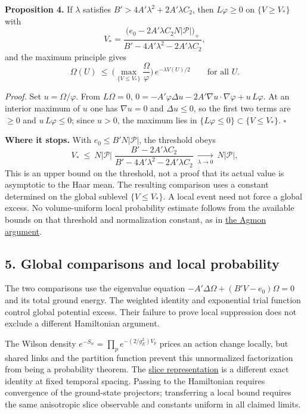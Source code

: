 \documentclass[11pt,a4paper]{article}
\begin{document}
\textbf{Proposition 4.} If \(\lambda\) satisfies
\(B'>4A'\lambda^2+2A'\lambda C_2\), then \(L\varphi\ge0\) on
\(\{V\ge V_*\}\) with
\[V_*=\frac{\big(e_0-2A'\lambda C_2N|\mathcal P|\big)_+}{B'-4A'\lambda^2-2A'\lambda C_2},\]
and the maximum principle gives
\[\Omega(U)\ \le\ \Big(\max_{\{V\le V_*\}}\frac{\Omega}{\varphi}\Big)\,e^{-\lambda V(U)/2}
\qquad\text{for all }U .\]

\emph{Proof.} Set \(u=\Omega/\varphi\). From \(L\Omega=0\),
\(0=-A'\varphi\Delta u-2A'\nabla u\!\cdot\!\nabla\varphi+u\,L\varphi\).
At an interior maximum of \(u\) one has \(\nabla u=0\) and
\(\Delta u\le0\), so the first two terms are \(\ge0\) and
\(u\,L\varphi\le0\); since \(u>0\), the maximum lies in
\(\{L\varphi\le0\}\subset\{V\le V_*\}\). \(\square\)

\textbf{Where it stops.} With \(e_0\le B'N|\mathcal P|\), the threshold
obeys
\[V_*\ \le\ N|\mathcal P|\;\frac{B'-2A'\lambda C_2}{B'-4A'\lambda^2-2A'\lambda C_2}
\ \xrightarrow[\lambda\to0]{}\ N|\mathcal P| ,\] This is an upper bound
on the threshold, not a proof that its actual value is asymptotic to the
Haar mean. The resulting comparison uses a constant determined on the
global sublevel \(\{V\le V_*\}\). A local event need not force a global
excess. No volume-uniform local probability estimate follows from the
available bounds on that threshold and normalization constant, as in
\href{agmon-ground-state-suppression.md}{the Agmon argument}.

\hypertarget{global-comparisons-and-local-probability}{%
\subsection{5. Global comparisons and local
probability}\label{global-comparisons-and-local-probability}}

The two comparisons use the eigenvalue equation
\(-A'\Delta\Omega+(B'V-e_0)\Omega=0\) and its total ground energy. The
weighted identity and exponential trial function control global
potential excess. Their failure to prove local suppression does not
exclude a different Hamiltonian argument.

The Wilson density \(e^{-S_w}=\prod_pe^{-(2/g_E^2)V_p}\) prices an
action change locally, but shared links and the partition function
prevent this unnormalized factorization from being a probability
theorem. The \href{ground-state-measure-transfer.md}{slice
representation} is a different exact identity at fixed temporal spacing.
Passing to the Hamiltonian requires convergence of the ground-state
projectors; transferring a local bound requires the same anisotropic
slice observable and constants uniform in all claimed limits.
\end{document}
